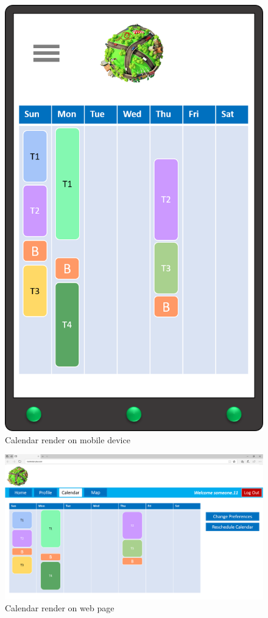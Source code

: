 \begin{figure}[H]
    \centering
    \includegraphics[scale=0.3]{Pictures/Mockups/AppCalendar.png}
    \caption{Calendar render on mobile device}
\end{figure}

\begin{figure}[H]
    \centering
    \includegraphics[scale=0.25]{Pictures/Mockups/SiteCalendar.png}
    \caption{Calendar render on web page}
\end{figure}

